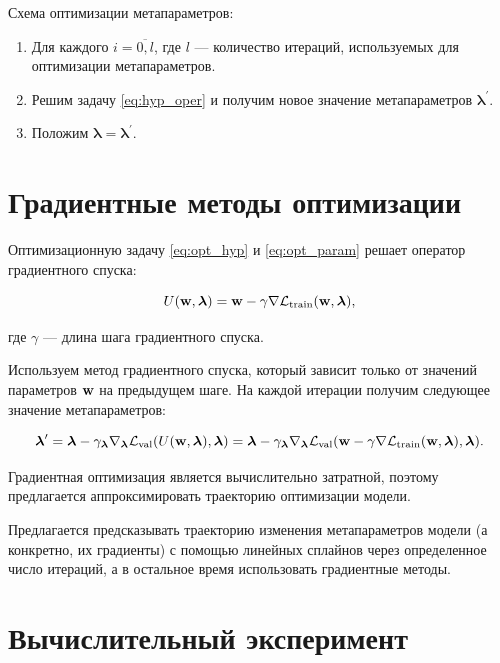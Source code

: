 \documentclass[12pt, twoside]{article}
\begin{document}
Схема оптимизации метапараметров:

\begin{enumerate}
    \item Для каждого $i = \overline{0, l}$, где $l$ --- количество итераций, используемых для оптимизации метапараметров.
    \item Решим задачу \eqref{eq:hyp_oper} и получим новое значение метапараметров $\boldsymbol{\lambda}^\prime$.
    \item Положим $\boldsymbol{\lambda} = \boldsymbol{\lambda}^\prime$.
\end{enumerate}

\section{Градиентные методы оптимизации}

Оптимизационную задачу \eqref{eq:opt_hyp} и \eqref{eq:opt_param} решает оператор градиентного спуска:

\begin{equation} \label{eq:operator}
    U(\bw, \boldsymbol{\lambda}) = \bw - \gamma\nabla\cL_\text{train}(\bw, \boldsymbol{\lambda}),
\end{equation}

\noindent
где $\gamma$ — длина шага градиентного спуска.

Используем метод градиентного спуска, который зависит только от значений параметров $\mathbf{w}$ на предыдущем шаге. На каждой итерации получим следующее значение метапараметров:

\begin{equation} \label{eq:hyp_alg}
    \boldsymbol{\lambda}^\prime = \boldsymbol{\lambda} - \gamma_{\boldsymbol{\lambda}}\nabla_{\boldsymbol{\lambda}}\cL_\text{val}(U(\bw, \boldsymbol{\lambda}), \boldsymbol{\lambda}) = \boldsymbol{\lambda} - \gamma_{\boldsymbol{\lambda}}\nabla_{\boldsymbol{\lambda}}\cL_\text{val}(\bw - \gamma\nabla\cL_\text{train}(\bw, \boldsymbol{\lambda}), \boldsymbol{\lambda}).
\end{equation}

Градиентная оптимизация является вычислительно затратной, поэтому предлагается аппроксимировать траекторию оптимизации модели. 

Предлагается предсказывать траекторию изменения метапараметров модели (а конкретно, их градиенты) с помощью линейных сплайнов через определенное число итераций, а в остальное время использовать градиентные методы.

\section{Вычислительный эксперимент}
\end{document}
